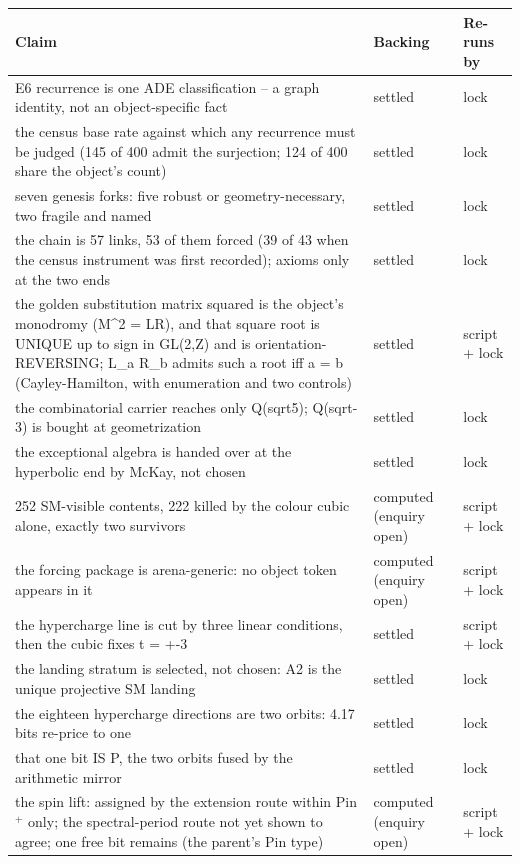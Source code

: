 \documentclass[11pt,a4paper]{article}
\theoremstyle{definition}
\theoremstyle{remark}
\begin{document}
\begingroup\small\setlength{\LTleft}{0pt}\setlength{\LTright}{0pt}
\begin{longtable}{@{}p{9.2cm}p{2.9cm}p{2.0cm}@{}}\toprule
\textbf{Claim} & \textbf{Backing} & \textbf{Re-runs by} \\ \midrule \endhead
\bottomrule \endfoot
E6 recurrence is one ADE classification -- a graph identity, not an object-specific fact & settled & lock \\
the census base rate against which any recurrence must be judged (145 of 400 admit the surjection; 124 of 400 share the object's count) & settled & lock \\
seven genesis forks: five robust or geometry-necessary, two fragile and named & settled & lock \\
the chain is 57 links, 53 of them forced (39 of 43 when the census instrument was first recorded); axioms only at the two ends & settled & lock \\
the golden substitution matrix squared is the object's monodromy (M\^{}2 = LR), and that square root is UNIQUE up to sign in GL(2,Z) and is orientation-REVERSING; L\_a R\_b admits such a root iff a = b (Cayley-Hamilton, with enumeration and two controls) & settled & script + lock \\
the combinatorial carrier reaches only Q(sqrt5); Q(sqrt-3) is bought at geometrization & settled & lock \\
the exceptional algebra is handed over at the hyperbolic end by McKay, not chosen & settled & lock \\
252 SM-visible contents, 222 killed by the colour cubic alone, exactly two survivors & computed (enquiry open) & script + lock \\
the forcing package is arena-generic: no object token appears in it & computed (enquiry open) & script + lock \\
the hypercharge line is cut by three linear conditions, then the cubic fixes t = +-3 & settled & script + lock \\
the landing stratum is selected, not chosen: A2 is the unique projective SM landing & settled & lock \\
the eighteen hypercharge directions are two orbits: 4.17 bits re-price to one & settled & lock \\
that one bit IS P, the two orbits fused by the arithmetic mirror & settled & lock \\
the spin lift: assigned by the extension route within Pin$^+$ only; the spectral-period route not yet shown to agree; one free bit remains (the parent's Pin type) & computed (enquiry open) & script + lock \\

\end{longtable}
\end{document}
